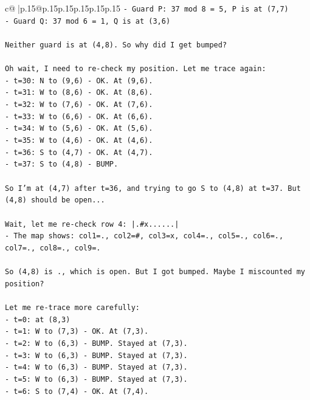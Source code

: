 \documentclass{article}
\begin{document}
{\begin{supertabular}{c@{$\;$}|p{.15\linewidth}@{}p{.15\linewidth}p{.15\linewidth}p{.15\linewidth}p{.15\linewidth}p{.15\linewidth}}
{{{\texttt{{-} Guard P: 37 mod 8 = 5, P is at (7,7)} \\
\texttt{{-} Guard Q: 37 mod 6 = 1, Q is at (3,6)} \\
\\ 
\texttt{Neither guard is at (4,8). So why did I get bumped?} \\
\\ 
\texttt{Oh wait, I need to re{-}check my position. Let me trace again:} \\
\texttt{{-} t=30: N to (9,6) {-} OK. At (9,6).} \\
\texttt{{-} t=31: W to (8,6) {-} OK. At (8,6).} \\
\texttt{{-} t=32: W to (7,6) {-} OK. At (7,6).} \\
\texttt{{-} t=33: W to (6,6) {-} OK. At (6,6).} \\
\texttt{{-} t=34: W to (5,6) {-} OK. At (5,6).} \\
\texttt{{-} t=35: W to (4,6) {-} OK. At (4,6).} \\
\texttt{{-} t=36: S to (4,7) {-} OK. At (4,7).} \\
\texttt{{-} t=37: S to (4,8) {-} BUMP.} \\
\\ 
\texttt{So I'm at (4,7) after t=36, and trying to go S to (4,8) at t=37. But (4,8) should be open...} \\
\\ 
\texttt{Wait, let me re{-}check row 4: |.\#x......|} \\
\texttt{{-} The map shows: col1=., col2=\#, col3=x, col4=., col5=., col6=., col7=., col8=., col9=.} \\
\\ 
\texttt{So (4,8) is ., which is open. But I got bumped. Maybe I miscounted my position?} \\
\\ 
\texttt{Let me re{-}trace more carefully:} \\
\texttt{{-} t=0: at (8,3)} \\
\texttt{{-} t=1: W to (7,3) {-} OK. At (7,3).} \\
\texttt{{-} t=2: W to (6,3) {-} BUMP. Stayed at (7,3).} \\
\texttt{{-} t=3: W to (6,3) {-} BUMP. Stayed at (7,3).} \\
\texttt{{-} t=4: W to (6,3) {-} BUMP. Stayed at (7,3).} \\
\texttt{{-} t=5: W to (6,3) {-} BUMP. Stayed at (7,3).} \\
\texttt{{-} t=6: S to (7,4) {-} OK. At (7,4).} \\
}}}
\end{supertabular}}
\end{document}

